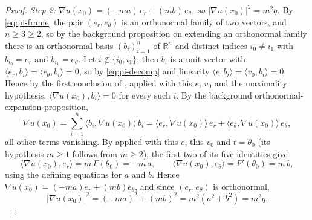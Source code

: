 \begin{proof}
\emph{Step 2: $\nabla u(x_0)=(-m a)\,e_r+(m b)\,e_\theta$, so
$\lvert\nabla u(x_0)\rvert^2=m^2q$.} By \eqref{eq:pi-frame} the pair
$(e_r,e_\theta)$ is an orthonormal family of two vectors, and $n\ge3\ge2$, so by
the background proposition on extending an orthonormal family there is an
orthonormal basis $(b_i)_{i=1}^{n}$ of $\mathbb{R}^n$ and distinct indices
$i_0\ne i_1$ with $b_{i_0}=e_r$ and $b_{i_1}=e_\theta$. Let
$i\notin\{i_0,i_1\}$; then $b_i$ is a unit vector with
$\langle e_r,b_i\rangle=\langle e_\theta,b_i\rangle=0$, so by
\eqref{eq:pi-decomp} and linearity $\langle e,b_i\rangle=\langle v_0,b_i\rangle=0$.
Hence by the first conclusion of , applied with
this $e$, $v_0$ and the maximality hypothesis, $\langle\nabla u(x_0),b_i\rangle=0$
for every such $i$. By the background orthonormal-expansion proposition,
\[
  \nabla u(x_0)=\sum_{i=1}^{n}\langle b_i,\nabla u(x_0)\rangle\,b_i
   =\langle e_r,\nabla u(x_0)\rangle\,e_r+\langle e_\theta,\nabla u(x_0)\rangle\,e_\theta ,
\]
all other terms vanishing. By  applied with this $e$, this
$v_0$ and $t=\theta_0$ (its hypothesis $m\ge1$ follows from $m\ge2$), the first
two of its five identities give
\begin{equation}\label{eq:pi-grad}
  \langle\nabla u(x_0),e_r\rangle=m\,F(\theta_0)=-m\,a,
  \qquad
  \langle\nabla u(x_0),e_\theta\rangle=F'(\theta_0)=m\,b,
\end{equation}
using the defining equations for $a$ and $b$. Hence
$\nabla u(x_0)=(-ma)e_r+(mb)e_\theta$, and since $(e_r,e_\theta)$ is orthonormal,
\begin{equation}\label{eq:pi-norm}
  \lvert\nabla u(x_0)\rvert^2=(-ma)^2+(mb)^2=m^2(a^2+b^2)=m^2q .
\end{equation}


\end{proof}
